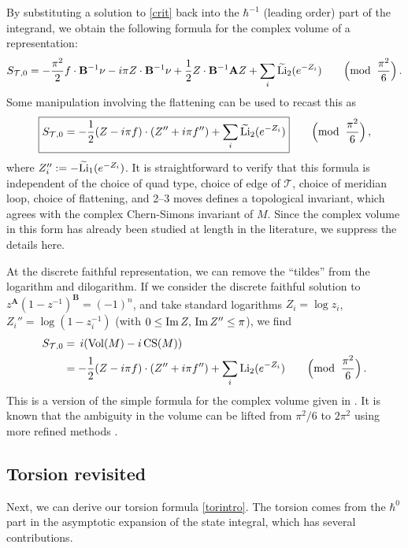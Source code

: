 \documentclass[12pt]{amsart}
\newcommand{\lbl}{\label}
\renewcommand{\eta}{\nu}
\theoremstyle{definition}
\def\be{  \begin{equation} }
\def\ee{  \end{equation} }
\newcommand{\CT}{\mathcal{T}}
\newcommand{\Li}{{\rm Li}}
\newcommand{\wt}{\widetilde}
\newcommand{\mb}{\mathbf}
\numberwithin{equation}{section}
\begin{document}
By substituting a solution to \eqref{crit} back into the $\hbar^{-1}$ 
(leading order) part of the integrand, we obtain the following formula for the complex 
volume of a representation: 
%
\be 
S_{\CT,0} = -\frac{\pi^2}{2}f\cdot \mb B^{-1}\eta
-i\pi Z\cdot\mb B^{-1}\eta+\frac1{2}Z\cdot\mb{B}^{-1}\mb A Z 
+\sum_i\wt{\Li}_2(e^{-Z_i}) \qquad \Big({\rm mod} \;\;\frac{\pi^2}{6}\Big)\,. 
\ee
%
Some manipulation involving the flattening can be used to 
recast this as 
%
\be \lbl{vol}
\boxed{ S_{\CT,0} = -\frac12 (Z-i\pi f)\cdot (Z''+i\pi f'')
+\sum_i\wt\Li_2(e^{-Z_i})} \qquad \Big({\rm mod} \;\;\frac{\pi^2}{6}\Big)\,,
\ee
%
where $Z_i'' := -\wt \Li_1(e^{-Z_i})$. It is straightforward 
to verify that this formula is independent of the choice of quad type,
choice of edge of $\CT$, choice of meridian loop, choice of
flattening, and 2--3 moves defines a topological invariant, which agrees
with the complex Chern-Simons invariant of $M$. Since the complex volume 
in this form has already been studied at length in the literature, 
we suppress the details here.

At the discrete faithful representation, we can remove the ``tildes''
from the logarithm and dilogarithm. If we consider the discrete faithful 
solution to $z^{\mb A}(1-z^{-1})^{\mb B}=(-1)^n$, and take standard logarithms 
$Z_i=\log z_i$, $Z_i''=\log(1-z_i^{-1})$ 
(with $0\leq {\rm Im}\,Z,\,{\rm Im}\,Z''\leq \pi$), we find
%
\begin{align}
S_{\CT,0} &= \,i({\rm Vol}(M)-i\,{\rm CS}(M)) \notag \\ &= 
-\frac12 (Z-i\pi f)\cdot (Z''+i\pi f'')+\sum_i\Li_2(e^{-Z_i}) 
\qquad \Big({\rm mod} \;\;\frac{\pi^2}{6}\Big)\,.
\end{align}
%
This is a version of the simple formula for the complex volume given in 
\cite{Neumann-combi}. It is known that the ambiguity in the volume can be 
lifted from $\pi^2/6$ to $2\pi^2$ using more refined methods 
\cite{N,DuZi,GoZi,Zickert-rep}.




\subsection{Torsion revisited}
\lbl{sec.torsion2}

Next, we can derive our torsion formula \eqref{torintro}. The torsion comes from the $\hbar^0$ part in the asymptotic expansion of the state integral,
which has several contributions.
\end{document}
